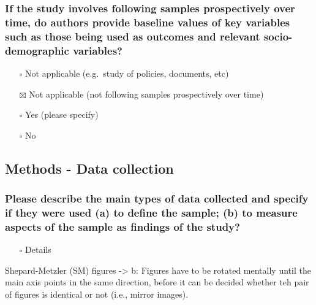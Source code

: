 \documentclass[
  doc, a4paper]{apa7}
\providecommand{\tightlist}{%
  \setlength{\itemsep}{0pt}\setlength{\parskip}{0pt}}
\begin{document}
\subsubsection{If the study involves following samples prospectively over time, do authors provide baseline values of key variables such as those being used as outcomes and relevant socio-demographic variables?}\label{if-the-study-involves-following-samples-prospectively-over-time-do-authors-provide-baseline-values-of-key-variables-such-as-those-being-used-as-outcomes-and-relevant-socio-demographic-variables}

\begin{itemize}
\tightlist
\item[$\square$]
  Not applicable (e.g.~study of policies, documents, etc)
\item[$\boxtimes$]
  Not applicable (not following samples prospectively over time)
\item[$\square$]
  Yes (please specify)
\item[$\square$]
  No
\end{itemize}

\subsection{Methods - Data collection}\label{methods---data-collection}

\subsubsection{Please describe the main types of data collected and specify if they were used (a) to define the sample; (b) to measure aspects of the sample as findings of the study?}\label{please-describe-the-main-types-of-data-collected-and-specify-if-they-were-used-a-to-define-the-sample-b-to-measure-aspects-of-the-sample-as-findings-of-the-study}

\begin{itemize}
\tightlist
\item[$\square$]
  Details
\end{itemize}

Shepard-Metzler (SM) figures -\textgreater{} b: Figures have to be rotated mentally until the main axis points in the same direction, before it can be decided whether teh pair of figures is identical or not (i.e., mirror images).
\end{document}
